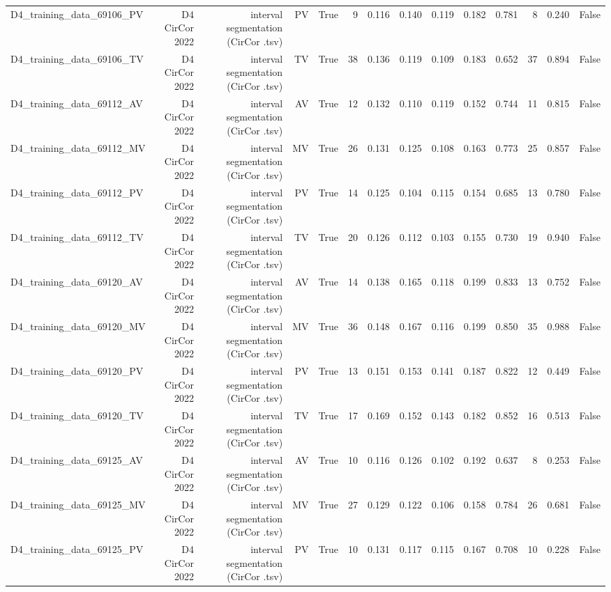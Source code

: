 \begin{table}[htbp]
\begin{tabular}{lrrrrrrrrrrrrr}
    D4\_training\_data\_69106\_PV & D4 CirCor 2022 & interval segmentation (CirCor .tsv) & PV & True & 9 & 0.116 & 0.140 & 0.119 & 0.182 & 0.781 & 8 & 0.240 & False \\
    D4\_training\_data\_69106\_TV & D4 CirCor 2022 & interval segmentation (CirCor .tsv) & TV & True & 38 & 0.136 & 0.119 & 0.109 & 0.183 & 0.652 & 37 & 0.894 & False \\
    D4\_training\_data\_69112\_AV & D4 CirCor 2022 & interval segmentation (CirCor .tsv) & AV & True & 12 & 0.132 & 0.110 & 0.119 & 0.152 & 0.744 & 11 & 0.815 & False \\
    D4\_training\_data\_69112\_MV & D4 CirCor 2022 & interval segmentation (CirCor .tsv) & MV & True & 26 & 0.131 & 0.125 & 0.108 & 0.163 & 0.773 & 25 & 0.857 & False \\
    D4\_training\_data\_69112\_PV & D4 CirCor 2022 & interval segmentation (CirCor .tsv) & PV & True & 14 & 0.125 & 0.104 & 0.115 & 0.154 & 0.685 & 13 & 0.780 & False \\
    D4\_training\_data\_69112\_TV & D4 CirCor 2022 & interval segmentation (CirCor .tsv) & TV & True & 20 & 0.126 & 0.112 & 0.103 & 0.155 & 0.730 & 19 & 0.940 & False \\
    D4\_training\_data\_69120\_AV & D4 CirCor 2022 & interval segmentation (CirCor .tsv) & AV & True & 14 & 0.138 & 0.165 & 0.118 & 0.199 & 0.833 & 13 & 0.752 & False \\
    D4\_training\_data\_69120\_MV & D4 CirCor 2022 & interval segmentation (CirCor .tsv) & MV & True & 36 & 0.148 & 0.167 & 0.116 & 0.199 & 0.850 & 35 & 0.988 & False \\
    D4\_training\_data\_69120\_PV & D4 CirCor 2022 & interval segmentation (CirCor .tsv) & PV & True & 13 & 0.151 & 0.153 & 0.141 & 0.187 & 0.822 & 12 & 0.449 & False \\
    D4\_training\_data\_69120\_TV & D4 CirCor 2022 & interval segmentation (CirCor .tsv) & TV & True & 17 & 0.169 & 0.152 & 0.143 & 0.182 & 0.852 & 16 & 0.513 & False \\
    D4\_training\_data\_69125\_AV & D4 CirCor 2022 & interval segmentation (CirCor .tsv) & AV & True & 10 & 0.116 & 0.126 & 0.102 & 0.192 & 0.637 & 8 & 0.253 & False \\
    D4\_training\_data\_69125\_MV & D4 CirCor 2022 & interval segmentation (CirCor .tsv) & MV & True & 27 & 0.129 & 0.122 & 0.106 & 0.158 & 0.784 & 26 & 0.681 & False \\
    D4\_training\_data\_69125\_PV & D4 CirCor 2022 & interval segmentation (CirCor .tsv) & PV & True & 10 & 0.131 & 0.117 & 0.115 & 0.167 & 0.708 & 10 & 0.228 & False \\

\end{tabular}
\end{table}
